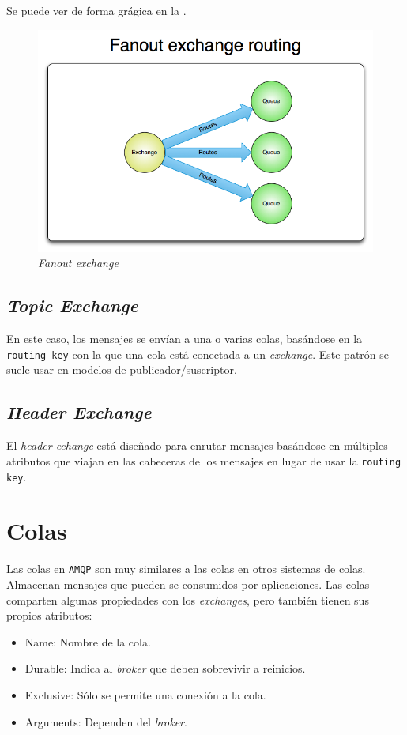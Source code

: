 Se puede ver de forma grágica en la .

\begin{figure}[htbp]
\centering
\includegraphics[width=0.75\linewidth]{05-amqp/figuras/fig003}
\caption{\emph{Fanout exchange}}
\label{fig:figura3}
\end{figure}

\subsection{\emph{Topic Exchange}}

En este caso, los mensajes se envían a una o varias colas, basándose en la
\texttt{routing key} con la que una cola está conectada a un \emph{exchange}. Este
patrón se suele usar en modelos de publicador/suscriptor.

\subsection{\emph{Header Exchange}}

El \emph{header echange} está diseñado para enrutar mensajes basándose en múltiples
atributos que viajan en las cabeceras de los mensajes en lugar de usar la
\texttt{routing key}.

\section{Colas}

Las colas en \texttt{AMQP} son muy similares a las colas en otros sistemas de
colas. Almacenan mensajes que pueden se consumidos por aplicaciones. Las colas
comparten algunas propiedades con los \emph{exchanges}, pero también tienen sus
propios atributos:

\begin{itemize}\itemsep1pt \parskip0pt 
\item Name: Nombre de la cola.
\item Durable: Indica al \emph{broker} que deben sobrevivir a
reinicios.
\item Exclusive: Sólo se permite una conexión a la cola.
\item Arguments: Dependen del \emph{broker}.
\end{itemize}


